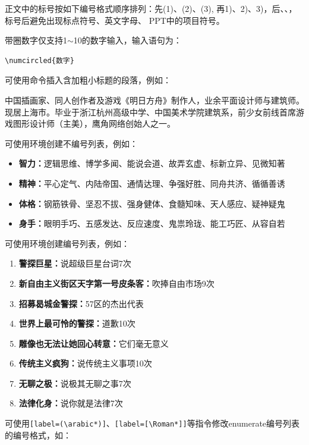 正文中的标号按如下编号格式顺序排列：先(1)、(2)、(3), 再1)、2)、3)，后、、，标号后避免出现标点符号、英文字母、 PPT中的项目符号。

带圈数字仅支持1$\sim$10的数字输入，输入语句为：
\begin{lstlisting}[language={[LaTeX]TeX}]
\numcircled{数字}
\end{lstlisting}

可使用命令插入含加粗小标题的段落，例如：

 中国插画家、同人创作者及游戏《明日方舟》制作人，业余平面设计师与建筑师。现居上海市。毕业于浙江杭州高级中学、中国美术学院建筑系，前少女前线首席游戏图形设计师（主美），鹰角网络创始人之一。

可使用环境创建不编号列表，例如：

\begin{itemize}
    \item \textbf{智力：}逻辑思维、博学多闻、能说会道、故弄玄虚、标新立异、见微知著
    \item \textbf{精神：}平心定气、内陆帝国、通情达理、争强好胜、同舟共济、循循善诱
    \item \textbf{体格：}钢筋铁骨、坚忍不拔、强身健体、食髓知味、天人感应、疑神疑鬼
    \item \textbf{身手：}眼明手巧、五感发达、反应速度、鬼祟玲珑、能工巧匠、从容自若
\end{itemize}

可使用环境创建编号列表，例如：

\begin{enumerate}
    \item \textbf{警探巨星：}说超级巨星台词7次
    \item \textbf{新自由主义街区天字第一号皮条客：}吹捧自由市场9次
    \item \textbf{招募曷城金警探：}57区的杰出代表
    \item \textbf{世界上最可怜的警探：}道歉10次
    \item \textbf{雕像也无法让她回心转意：}它们毫无意义
    \item \textbf{传统主义疯狗：}说传统主义事项10次
    \item \textbf{无聊之极：}说极其无聊之事7次
    \item \textbf{法律化身：}说你就是法律7次
\end{enumerate}

可使用\texttt{[label=(\textbackslash arabic*)]}、\texttt{[label={[}\textbackslash Roman*{]}]}等指令修改enumerate编号列表的编号格式，如：

